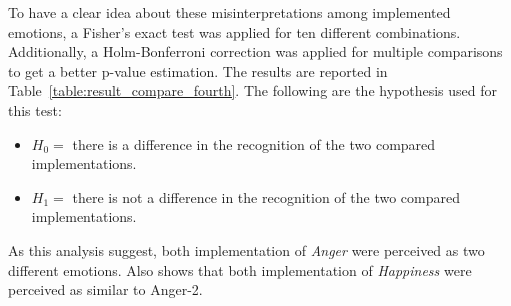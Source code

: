 To have a clear idea about these misinterpretations among implemented emotions, a Fisher's exact test was applied for ten different combinations. Additionally, a Holm-Bonferroni correction was applied for multiple comparisons to get a better p-value estimation. The results are reported in Table~\ref{table:result_compare_fourth}. The following are the hypothesis used for this test:

\begin{itemize}
	\item $H_0 = $ there is a difference in the recognition of the two compared implementations.
	\item $H_1 = $ there is not a difference in the recognition of the two compared implementations.
\end{itemize}

As this analysis suggest, both implementation of \textit{Anger} were perceived as two different emotions. Also shows that both implementation of \textit{Happiness} were perceived as similar to Anger-2.


